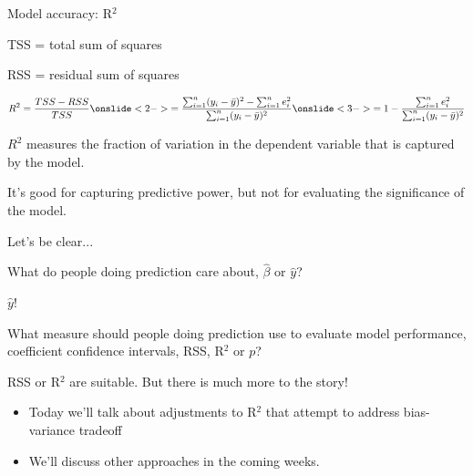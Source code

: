 \documentclass[aspectratio=169]{beamer}
\begin{document}
\begin{frame}{Model accuracy: R$^2$}

TSS = total sum of squares

\vspace{3mm}

RSS = residual sum of squares

  \begin{align*}
    R^2 = \frac{TSS - RSS}{TSS} \onslide<2->{= \frac{\sum_{i=1}^n (y_i-\bar{y})^2 - \sum_{i=1}^n e_i^2}{\sum_{i=1}^n (y_i-\bar{y})^2}}\onslide<3->{ = 1-\frac{\sum_{i=1}^n e_i^2}{\sum_{i=1}^n (y_i-\bar{y})^2} }
  \end{align*}

  \pause\pause
  $R^2$ measures the fraction of variation in the dependent variable that is captured by the model.  

\pause
\vspace{5mm}

It's good for capturing predictive power, but not for evaluating the significance of the model.

\end{frame}


\begin{frame}{Let's be clear...}

What do people doing prediction care about, $\hat{\beta}$ or $\hat{y}$?

\vspace{5mm}
\pause

$\hat{y}$!

\vspace{5mm}
\pause

What measure should people doing prediction use to evaluate model performance, coefficient confidence intervals, RSS, R$^2$ or $p$?

\vspace{5mm}
\pause

RSS or R$^2$ are suitable.  But there is much more to the story! 
\begin{itemize}
  \item Today we'll talk about adjustments to R$^2$ that attempt to address bias-variance tradeoff
  \item  We'll discuss other approaches in the coming weeks.
\end{itemize}

\end{frame}
\end{document}

